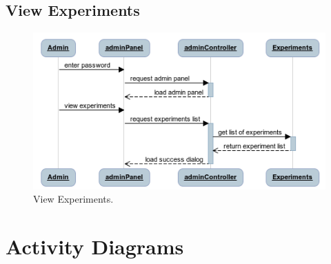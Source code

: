 \documentclass[a4paper,12pt,oneside]{report}
\begin{document}
\subsection{View Experiments}
\vskip 1cm
\begin{figure}[!hp]
  \begin{center}
   \includegraphics[width=11.5cm]{pics/view_experiments.png}
  \end{center}
\caption{View Experiments.}
\end{figure}


\newpage

\section{Activity Diagrams}
\end{document}
